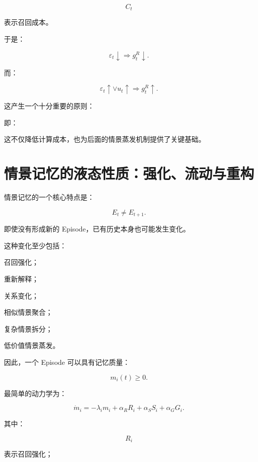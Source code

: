 \[
C_t
\]

表示召回成本。

于是：

\[
\boxed{
\varepsilon_t\downarrow
\Rightarrow
g_t^R\downarrow.
}
\]

而：

\[
\boxed{
\varepsilon_t\uparrow
\lor
u_t\uparrow
\Rightarrow
g_t^R\uparrow.
}
\]

这产生一个十分重要的原则：

\begin{statementbox}
\centering
{}
\end{statementbox}

即：

\begin{statementbox}
\centering
{}
\end{statementbox}

这不仅降低计算成本，也为后面的情景蒸发机制提供了关键基础。


\section{情景记忆的液态性质：强化、流动与重构}

情景记忆的一个核心特点是：

\[
\boxed{
E_t\neq E_{t+1}.
}
\]

即使没有形成新的 Episode，已有历史本身也可能发生变化。

这种变化至少包括：

召回强化；

重新解释；

关系变化；

相似情景聚合；

复杂情景拆分；

低价值情景蒸发。

因此，一个 Episode 可以具有记忆质量：

\[
m_i(t)\ge0.
\]

最简单的动力学为：

\[
\boxed{
\dot m_i
=
-\lambda_i m_i
+
\alpha_RR_i
+
\alpha_SS_i
+
\alpha_GG_i.
}
\]

其中：

\[
R_i
\]

表示召回强化；

